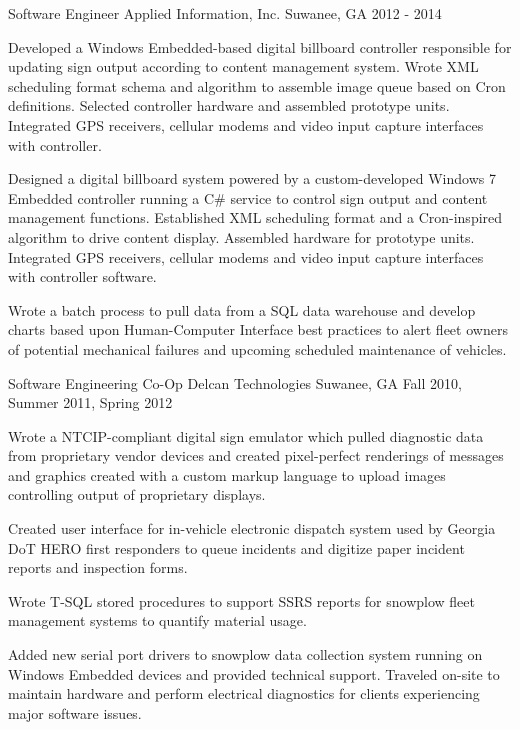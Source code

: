 \begin{cventries}
  \cventry
    {Software Engineer} %
    {Applied Information, Inc.} %
    {Suwanee, GA} %
    {2012 - 2014} %
    {
      \begin{cvitems} %
        \item {Developed a Windows Embedded-based digital billboard controller responsible for updating sign output according to content management system. Wrote XML scheduling format schema and algorithm to assemble image queue based on Cron definitions. Selected controller hardware and assembled prototype units. Integrated GPS receivers, cellular modems and video input capture interfaces with controller.}
        \item {Designed a digital billboard system powered by a custom-developed Windows 7 Embedded controller running a C\# service to control sign output and content management functions. Established XML scheduling format and a Cron-inspired algorithm to drive content display. Assembled hardware for prototype units. Integrated GPS receivers, cellular modems and video input capture interfaces with controller software.}
	\item {Wrote a batch process to pull data from a SQL data warehouse and develop charts based upon Human-Computer Interface best practices to alert fleet owners of potential mechanical failures and upcoming scheduled maintenance of vehicles.}
      \end{cvitems}
    }

  \cventry
    {Software Engineering Co-Op} %
    {Delcan Technologies} %
    {Suwanee, GA} %
    {Fall 2010, Summer 2011, Spring 2012} %
    {
      \begin{cvitems} %
        \item {Wrote a NTCIP-compliant digital sign emulator which pulled diagnostic data from proprietary vendor devices and created pixel-perfect renderings of messages and graphics created with a custom markup language to upload images controlling output of proprietary displays.}
		\item {Created user interface for in-vehicle electronic dispatch system used by Georgia DoT HERO first responders to queue incidents and digitize paper incident reports and inspection forms.}
		\item {Wrote T-SQL stored procedures to support SSRS reports for snowplow fleet management systems to quantify material usage.}
		\item {Added new serial port drivers to snowplow data collection system running on Windows Embedded devices and provided technical support. Traveled on-site to maintain hardware and perform electrical diagnostics for clients experiencing major software issues.}
      \end{cvitems}
    }
\end{cventries}
